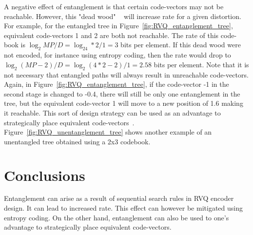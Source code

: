 A negative effect of entanglement is that certain code-vectors may not be reachable.  However, this "dead wood" ~\cite{1996_JNL_AdvancesRVQ_Barnes} will increase rate for a given distortion.  For example, for the entangled tree in Figure~\ref{fig:RVQ_entanglement_tree}, equivalent code-vectors 1 and 2 are both not reachable.  The rate of this code-book is $\log_2MP/D=\log_24*2/1=3$ bits per element.  If this dead wood were not encoded, for instance using entropy coding, then the rate would drop to $\log_2(MP-2)/D=\log_2(4*2-2)/1=2.58$ bits per element.  Note that it is not necessary that entangled paths will always result in unreachable code-vectors.  Again, in Figure~\ref{fig:RVQ_entanglement_tree}, if the code-vector -1 in the second stage is changed to -0.4, there will still be only one entanglement in the tree, but the equivalent code-vector 1 will move to a new position of 1.6 making it reachable.  This sort of design strategy can be used as an advantage to strategically place equivalent code-vectors~\cite{1996_JNL_AdvancesRVQ_Barnes}.  Figure~\ref{fig:RVQ_unentanglement_tree} shows another example of an unentangled tree obtained using a 2x3 codebook.

\section{Conclusions}
Entanglement can arise as a result of sequential search rules in RVQ encoder design.  It can lead to increased rate.  This effect can however be mitigated using entropy coding.  On the other hand, entanglement can also be used to one's advantage to strategically place equivalent code-vectors.  

\normalsize


